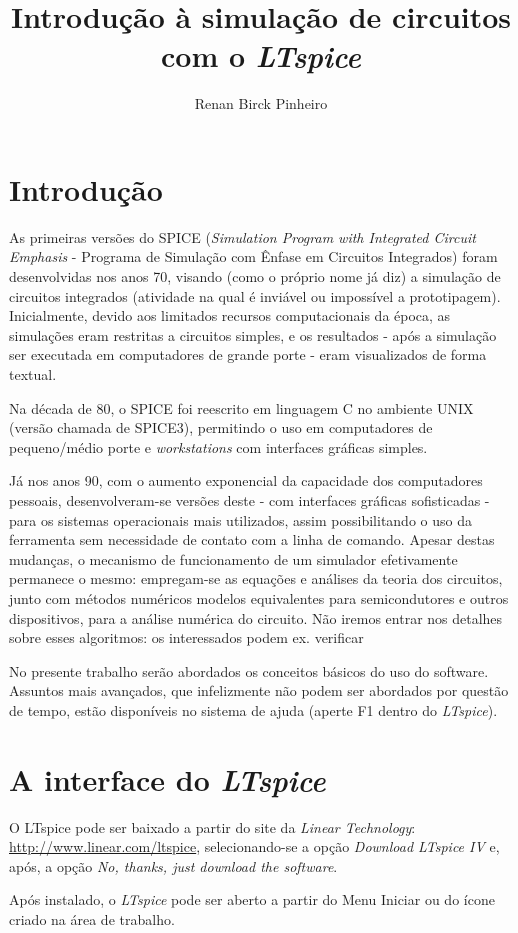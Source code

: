 \documentclass[]{report}
\title{\textbf{Introdução à simulação de circuitos com o \textit{LTspice}}}
\author{Renan Birck Pinheiro}
\begin{document}


\chapter{Introdução}
As primeiras versões do SPICE (\textit{Simulation Program with Integrated Circuit Emphasis} - Programa de Simulação com Ênfase em Circuitos Integrados) foram desenvolvidas nos anos 70, visando (como o próprio nome já diz) a simulação de circuitos integrados (atividade na qual é inviável ou impossível a prototipagem). Inicialmente, devido aos limitados recursos computacionais da época, as simulações eram restritas a circuitos simples, e os resultados - após a simulação ser executada em computadores de grande porte - eram visualizados de forma textual.

Na década de 80, o SPICE foi reescrito em linguagem C no ambiente UNIX (versão chamada de SPICE3), permitindo o uso em computadores de pequeno/médio porte e \textit{workstations} com interfaces gráficas simples. 

Já nos anos 90, com o aumento exponencial da capacidade dos computadores pessoais, desenvolveram-se versões deste - com interfaces gráficas sofisticadas - para os sistemas operacionais mais utilizados, assim possibilitando o uso da ferramenta sem necessidade de contato com a linha de comando. Apesar destas mudanças, o mecanismo de funcionamento de um simulador  efetivamente permanece o mesmo: empregam-se as equações e análises da teoria dos circuitos, junto com métodos numéricos modelos equivalentes para semicondutores e outros dispositivos, para a análise numérica do circuito. Não iremos entrar nos detalhes sobre esses algoritmos: os interessados podem ex. verificar \cite{nagel}

No presente trabalho serão abordados os conceitos básicos do uso do software. Assuntos mais avançados, que infelizmente não podem ser abordados por questão de tempo, estão disponíveis no sistema de ajuda (aperte F1 dentro do \textit{LTspice}).
\chapter{A interface do \textit{LTspice}}
O LTspice pode ser baixado a partir do site da \textit{Linear Technology}: \url{http://www.linear.com/ltspice}, selecionando-se a opção \textit{Download LTspice IV} e, após, a opção \textit{No, thanks, just download the software}. 

Após instalado, o \textit{LTspice} pode ser aberto a partir do Menu Iniciar ou do ícone criado na área de trabalho. 
\end{document}
